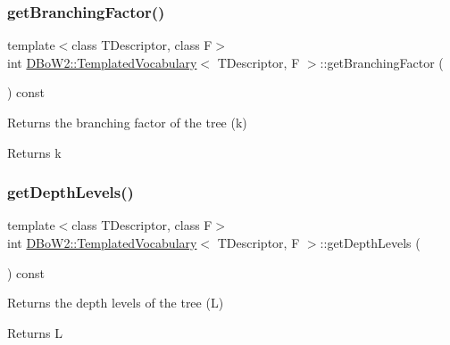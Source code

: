 \subsubsection{\texorpdfstring{get\+Branching\+Factor()}{getBranchingFactor()}}
{\footnotesize\ttfamily template$<$class T\+Descriptor, class F$>$ \\
int \mbox{\hyperlink{class_d_bo_w2_1_1_templated_vocabulary}{D\+Bo\+W2\+::\+Templated\+Vocabulary}}$<$ T\+Descriptor, F $>$\+::get\+Branching\+Factor (\begin{DoxyParamCaption}{ }\end{DoxyParamCaption}) const\hspace{0.3cm}{\ttfamily [inline]}}

Returns the branching factor of the tree (k) \begin{DoxyReturn}{Returns}
k 
\end{DoxyReturn}
\mbox{\label{class_d_bo_w2_1_1_templated_vocabulary_a5a7d1b3ad0c705705d516a9a144e3f38}} 
\subsubsection{\texorpdfstring{get\+Depth\+Levels()}{getDepthLevels()}}
{\footnotesize\ttfamily template$<$class T\+Descriptor, class F$>$ \\
int \mbox{\hyperlink{class_d_bo_w2_1_1_templated_vocabulary}{D\+Bo\+W2\+::\+Templated\+Vocabulary}}$<$ T\+Descriptor, F $>$\+::get\+Depth\+Levels (\begin{DoxyParamCaption}{ }\end{DoxyParamCaption}) const\hspace{0.3cm}{\ttfamily [inline]}}

Returns the depth levels of the tree (L) \begin{DoxyReturn}{Returns}
L 
\end{DoxyReturn}
\mbox{\label{class_d_bo_w2_1_1_templated_vocabulary_ae67da4c7b30c15ed4faba2ad6ed4549e}} 
